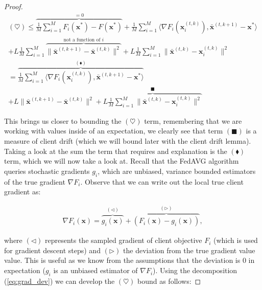 \begin{proof}
\begin{align*}
    (\heartsuit) \leq \overbrace{\frac{1}{M} \sum_{i=1}^M F_i(\bm{x}^{*}) - F(\bm{x}^*)}^{=0} + \frac{1}{M} \sum_{i=1}^M  \langle \nabla F_i(\bm{x}_i^{(t,k)}) ,\bar{\bm{x}}^{(t,k+1)} - \bm{x}^{*} \rangle \\+ L \frac{1}{M} \sum_{i=1}^M \overbrace{ \|\bar{\bm{x}}^{(t,k+1)}-\bar{\bm{x}}^{(t,k)} \|^2}^\text{not a function of $i$}  + L \frac{1}{M} \sum_{i=1}^M \|\bar{\bm{x}}^{(t,k)}-\bm{x}_i^{(t,k)} \|^2 \\
    = \overbrace{\frac{1}{M} \sum_{i=1}^M  \langle \nabla F_i(\bm{x}_i^{(t,k)}) ,\bar{\bm{x}}^{(t,k+1)} - \bm{x}^{*} \rangle}^{(\blacklozenge)} \\+ L  \|\bar{\bm{x}}^{(t,k+1)}-\bar{\bm{x}}^{(t,k)} \|^2  +\overbrace{ L \frac{1}{M} \sum_{i=1}^M \|\bar{\bm{x}}^{(t,k)}-\bm{x}_i^{(t,k)} \|^2 }^{{\blacksquare}}
\end{align*}

This brings us closer to bounding the $(\heartsuit)$ term, remembering that we are working with values inside of an expectation, we clearly see that term $(\blacksquare)$ is a measure of client drift (which we will bound later with the client drift lemma). Taking a look at the sum the term that requires and explanation is the $(\blacklozenge)$ term, which we will now take a look at. Recall that the FedAVG algorithm queries stochastic gradients $g_i$, which are unbiased, variance bounded estimators of the true gradient $\nabla F_i$. Observe that we can write out the local true client gradient as:

\begin{align}
    \nabla F_i(\bm{x}) = \overbrace{g_i(\bm{x})}^{(\triangleleft)} + \overbrace{\left(F_i(\bm{x}) - g_i(\bm{x}) \right)}^{(\triangleright)},
    \label{eq:grad_dev}
\end{align}

where $(\triangleleft)$ represents the sampled gradient of client objective $F_i$ (which is used for gradient descent steps) and $(\triangleright)$ the deviation from the true gradient value value. This is useful as we know from the assumptions that the deviation is $0$ in expectation ($g_i$ is an unbiased estimator of $\nabla F_i$). Using the decomposition (\ref{eq:grad_dev}) we can develop the $(\heartsuit)$ bound as follows:


\end{proof}
